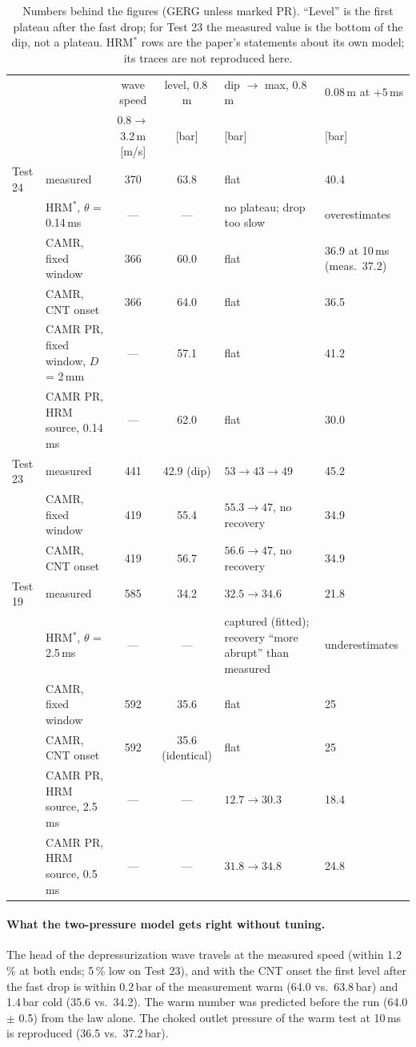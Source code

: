 \documentclass[11pt,a4paper]{article}
\begin{document}
\begin{table}[htbp]\centering\scriptsize\setlength{\tabcolsep}{2.5pt}
\caption{Numbers behind the figures (GERG unless marked PR). ``Level'' is the first plateau after the fast drop; for Test 23 the measured value is the bottom of the dip, not a plateau. HRM$^*$ rows are the paper's statements about its own model; its traces are not reproduced here.}
\begin{tabular}{llccp{2.7cm}p{2.1cm}}\toprule
& & wave speed & level, 0.8\,m & dip $\to$ max, 0.8\,m & 0.08\,m at $+5$\,ms\\
& & 0.8$\to$3.2\,m [m/s] & [bar] & [bar] & [bar]\\\midrule
Test 24 & measured & 370 & 63.8 & flat & 40.4\\
& HRM$^*$, $\theta$ = 0.14\,ms & --- & --- & no plateau; drop too slow & overestimates\\
& CAMR, fixed window & 366 & 60.0 & flat & 36.9 at 10\,ms (meas.\ 37.2)\\
& CAMR, CNT onset & 366 & 64.0 & flat & 36.5\\
& CAMR PR, fixed window, $D$ = 2\,mm & --- & 57.1 & flat & 41.2\\
& CAMR PR, HRM source, 0.14\,ms & --- & 62.0 & flat & 30.0\\\midrule
Test 23 & measured & 441 & 42.9 (dip) & $53 \to 43 \to 49$ & 45.2\\
& CAMR, fixed window & 419 & 55.4 & $55.3 \to 47$, no recovery & 34.9\\
& CAMR, CNT onset & 419 & 56.7 & $56.6 \to 47$, no recovery & 34.9\\\midrule
Test 19 & measured & 585 & 34.2 & $32.5 \to 34.6$ & 21.8\\
& HRM$^*$, $\theta$ = 2.5\,ms & --- & --- & captured (fitted); recovery ``more abrupt'' than measured & underestimates\\
& CAMR, fixed window & 592 & 35.6 & flat & 25\\
& CAMR, CNT onset & 592 & 35.6 (identical) & flat & 25\\
& CAMR PR, HRM source, 2.5\,ms & --- & --- & $12.7 \to 30.3$ & 18.4\\
& CAMR PR, HRM source, 0.5\,ms & --- & --- & $31.8 \to 34.8$ & 24.8\\\bottomrule
\end{tabular}\end{table}

\paragraph{What the two-pressure model gets right without tuning.} The head of the depressurization wave travels at the measured speed (within 1.2\,\% at both ends; 5\,\% low on Test 23), and with the CNT onset the first level after the fast drop is within 0.2\,bar of the measurement warm (64.0 vs.\ 63.8\,bar) and 1.4\,bar cold (35.6 vs.\ 34.2). The warm number was predicted before the run (64.0 $\pm$ 0.5) from the law alone. The choked outlet pressure of the warm test at 10\,ms is reproduced (36.5 vs.\ 37.2\,bar).
\end{document}
